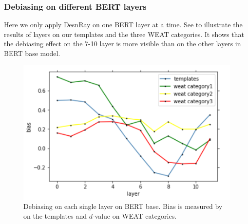 \subsubsection{Debiasing on different BERT layers}
Here we only apply DesnRay on one BERT layer at a time. See  to illustrate the results of layers on our templates and the three WEAT categories. It shows that the debiasing effect on the 7-10 layer is more visible than on the other layers in BERT base model.
\begin{figure}[ht]
	\centering
	\includegraphics[width=0.9\linewidth]{layers_base}
	\caption{Debiasing on each single layer on BERT base. Bias is measured by  on the templates and $d$-value on WEAT categories.}
\end{figure}

